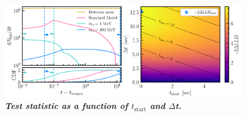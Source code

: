 
\begin{figure}
    \centering
    \includegraphics[width=0.95\textwidth]{figures/hits_and_likelihood.pdf}
    \caption{\textbf{\textit{Test statistic as a function of $t_{\mathrm{start}}$ and $\Delta$t.}
    }}
    \label{fig:hits_and_likelihood}
\end{figure}
